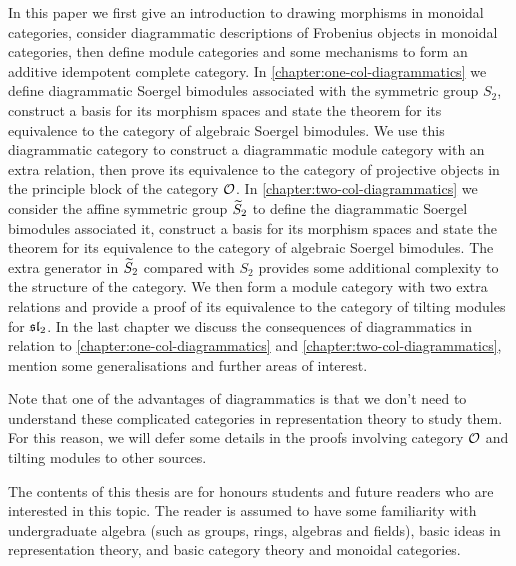 In this paper we first give an introduction to drawing morphisms in monoidal categories, consider diagrammatic descriptions of Frobenius objects in monoidal categories, then define module categories and some mechanisms to form an additive idempotent complete category. In \autoref{chapter:one-col-diagrammatics} we define diagrammatic Soergel bimodules associated with the symmetric group $S_2$, construct a basis for its morphism spaces and state the theorem for its equivalence to the category of algebraic Soergel bimodules. We use this diagrammatic category to construct a diagrammatic module category with an extra relation, then prove its equivalence to the category of projective objects in the principle block of the category $\mathcal{O}$. In \autoref{chapter:two-col-diagrammatics} we consider the affine symmetric group $\widetilde{S}_2$ to define the diagrammatic Soergel bimodules associated it, construct a basis for its morphism spaces and state the theorem for its equivalence to the category of algebraic Soergel bimodules. The extra generator in $\widetilde{S}_2$ compared with $S_2$ provides some additional complexity to the structure of the category. We then form a module category with two extra relations and provide a proof of its equivalence to the category of tilting modules for $\operatorname{\mathfrak{sl}}_2$. In the last chapter we discuss the consequences of diagrammatics in relation to \autoref{chapter:one-col-diagrammatics} and \autoref{chapter:two-col-diagrammatics}, mention some generalisations and further areas of interest.

Note that one of the advantages of diagrammatics is that we don't need to understand these complicated categories in representation theory to study them. For this reason, we will defer some details in the proofs involving category $\mathcal{O}$ and tilting modules to other sources.

The contents of this thesis are for honours students and future readers who are interested in this topic. The reader is assumed to have some familiarity with undergraduate algebra (such as groups, rings, algebras and fields), basic ideas in representation theory, and basic category theory and monoidal categories.
